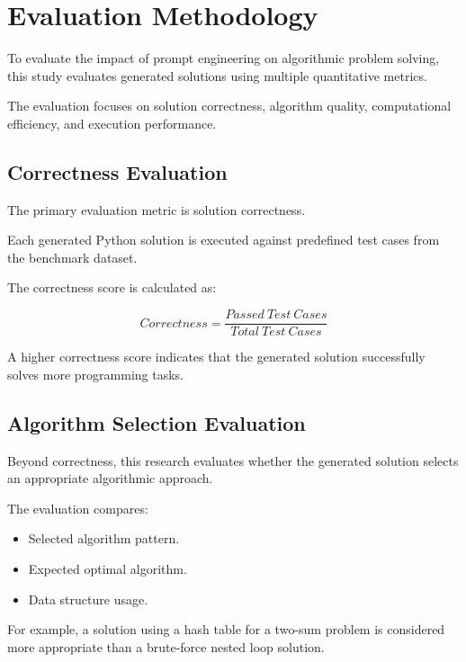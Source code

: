 \section{Evaluation Methodology}


To evaluate the impact of prompt engineering on algorithmic problem solving,
this study evaluates generated solutions using multiple quantitative metrics.

The evaluation focuses on solution correctness, algorithm quality, computational
efficiency, and execution performance.



\subsection{Correctness Evaluation}


The primary evaluation metric is solution correctness.


Each generated Python solution is executed against predefined test cases from
the benchmark dataset.


The correctness score is calculated as:


\[
Correctness = \frac{Passed\ Test\ Cases}{Total\ Test\ Cases}
\]


A higher correctness score indicates that the generated solution successfully
solves more programming tasks.



\subsection{Algorithm Selection Evaluation}


Beyond correctness, this research evaluates whether the generated solution
selects an appropriate algorithmic approach.


The evaluation compares:

\begin{itemize}

\item Selected algorithm pattern.

\item Expected optimal algorithm.

\item Data structure usage.

\end{itemize}


For example, a solution using a hash table for a two-sum problem is considered
more appropriate than a brute-force nested loop solution.



